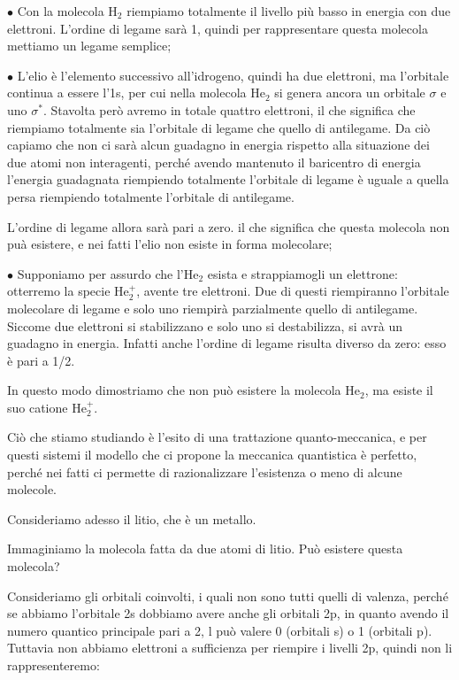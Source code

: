\vspace{0.2cm}$\bullet$ Con la molecola H$_2$ riempiamo totalmente il livello più basso in energia con due elettroni. L'ordine di legame sarà 1, quindi per rappresentare questa molecola mettiamo un legame semplice;

\vspace{0.2cm}$\bullet$ L'elio è l'elemento successivo all'idrogeno, quindi ha due elettroni, ma l'orbitale continua a essere l'1s, per cui nella molecola He$_2$ si genera ancora un orbitale $\sigma$ e uno $\sigma^*$. Stavolta però avremo in totale quattro elettroni, il che significa che riempiamo totalmente sia l'orbitale di legame che quello di antilegame. Da ciò capiamo che non ci sarà alcun guadagno in energia rispetto alla situazione dei due atomi non interagenti, perché avendo mantenuto il baricentro di energia l'energia guadagnata riempiendo totalmente l'orbitale di legame è uguale a quella persa riempiendo totalmente l'orbitale di antilegame.

L'ordine di legame allora sarà pari a zero. il che significa che questa molecola non puà esistere, e nei fatti l'elio non esiste in forma molecolare;

\vspace{0.2cm}$\bullet$ Supponiamo per assurdo che l'He$_2$ esista e strappiamogli un elettrone: otterremo la specie He$_2^+$, avente tre elettroni. Due di questi riempiranno l'orbitale molecolare di legame e solo uno riempirà parzialmente quello di antilegame. Siccome due elettroni si stabilizzano e solo uno si destabilizza, si avrà un guadagno in energia. Infatti anche l'ordine di legame risulta diverso da zero: esso è pari a 1/2.

In questo modo dimostriamo che non può esistere la molecola He$_2$, ma esiste il suo catione He$_2^+$.

\vspace{0.2cm} Ciò che stiamo studiando è l'esito di una trattazione quanto-meccanica, e per questi sistemi il modello che ci propone la meccanica quantistica è perfetto, perché nei fatti ci permette di razionalizzare l'esistenza o meno di alcune molecole.

\vspace{0.2cm}Consideriamo adesso il litio, che è un metallo.

Immaginiamo la molecola fatta da due atomi di litio. Può esistere questa molecola?

Consideriamo gli orbitali coinvolti, i quali non sono tutti quelli di valenza, perché se abbiamo l'orbitale 2s dobbiamo avere anche gli orbitali 2p, in quanto avendo il numero quantico principale pari a 2, l può valere 0 (orbitali s) o 1 (orbitali p). Tuttavia non abbiamo elettroni a sufficienza per riempire i livelli 2p, quindi non li rappresenteremo:

